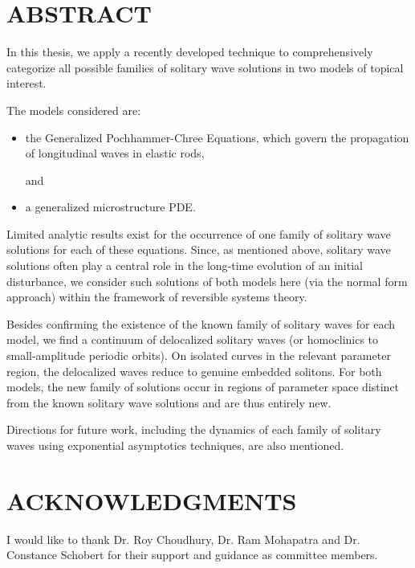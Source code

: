 \chapter*{ABSTRACT}

\indent 

In this thesis, we apply a recently developed technique to
comprehensively categorize all possible families of solitary wave
solutions in two models of topical interest.

The models considered are:
\begin{itemize}
\item the Generalized Pochhammer-Chree Equations, which  govern the propagation of longitudinal waves in elastic rods,

and

\item a generalized microstructure PDE.
\end{itemize}

Limited analytic results exist for the occurrence of one family
of  solitary wave solutions for each of these equations. Since, as
mentioned above, solitary wave solutions often play a central role in
the long-time evolution of an initial disturbance, we consider
such solutions of both models here (via the normal form approach)
within the framework of reversible systems theory.

Besides confirming
the existence of the known family of solitary waves for each model,
we find a continuum of delocalized solitary waves
(or homoclinics to small-amplitude periodic orbits).
On isolated curves in the relevant parameter region, the delocalized
waves reduce to genuine embedded solitons.
For both models, the new family of solutions occur in regions of
parameter space distinct from the known solitary wave solutions and
are thus entirely new.

Directions for future work, including the dynamics of each family of
solitary waves using exponential asymptotics techniques, are also mentioned.



\dedication{
Dedicated To My Family
}



\newpage
{}
\chapter*{ACKNOWLEDGMENTS}

I would like to thank Dr. Roy Choudhury, Dr. Ram Mohapatra and Dr. Constance Schobert for their support and guidance as committee members.

\newpage
